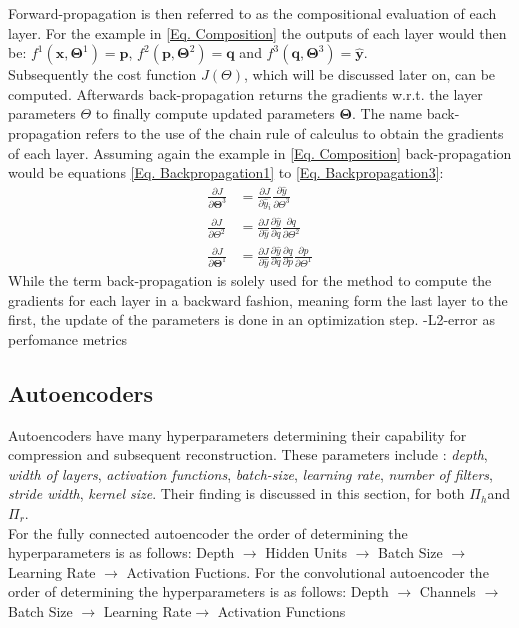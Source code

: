 \documentclass[12pt, a4paper]{article}
\newcommand{\hy}{\(\Pi_h\)}
\newcommand{\rare}{\(\Pi_r\)}
\begin{document}
\noindent
Forward-propagation is then referred to as the compositional evaluation of each layer. For the example in \cref{Eq. Composition} the outputs of each layer would then be:  \(f^1(\mathbf{x},\mathbf{\Theta}^1) = \mathbf{p}\), \(f^2(\mathbf{p},\mathbf{\Theta}^2) = \mathbf{q}\) and \(f^3(\mathbf{q},\mathbf{\Theta}^3) = \mathbf{\hat{y}}\).\\
Subsequently the cost function \(J(\Theta)\), which will be discussed later on, can be computed. Afterwards back-propagation returns the gradients w.r.t. the layer parameters \(\Theta\) to finally compute updated parameters \(\mathbf{\Theta}\).  The name back-propagation refers to the use of the chain rule of calculus to obtain the gradients of each layer. Assuming again the example in \cref{Eq. Composition} back-propagation would be equations \cref{Eq. Backpropagation1} to \cref{Eq. Backpropagation3}:
\begin{align}
	\frac{\partial J}{\partial \mathbf{\Theta}^3} &= \frac{\partial J}{\partial\hat{y}_i}\frac{\partial\hat{y}}{\partial \Theta^3}
\label{Eq. Backpropagation3}\\
	\frac{\partial J}{\partial \Theta^2} &= \frac{\partial J}{\partial\hat{y}}\frac{\partial\hat{y}}{\partial q}\frac{\partial q}{\partial \Theta^2}
\label{Eq. Backpropagation2}\\
	\frac{\partial J}{\partial \mathbf{\Theta}^1} &= \frac{\partial J}{\partial\hat{y}}\frac{\partial\hat{y}}{\partial q}\frac{\partial q}{\partial p}\frac{\partial p}{\partial \Theta^1}
\label{Eq. Backpropagation1}
\end{align}
While the term back-propagation is solely used for the method to compute the gradients for each layer in a backward fashion, meaning form the last layer to the first, the update of the parameters is done in an optimization step.
-L2-error as perfomance metrics
\subsection{Autoencoders}
Autoencoders have many hyperparameters determining their capability for compression and subsequent reconstruction. These parameters include : \textit{depth}, \textit{width of layers}, \textit{activation functions}, \textit{batch-size}, \textit{learning rate}, \textit{number of filters}, \textit{stride width}, \textit{kernel size}. Their finding is discussed in this section, for both \hy and \rare.\\
For the fully connected autoencoder the order of determining the hyperparameters is as follows:
Depth $\rightarrow$ Hidden Units $\rightarrow$ Batch Size $\rightarrow$ Learning Rate $\rightarrow$ Activation Fuctions.
For the convolutional autoencoder the order of determining the hyperparameters is as follows:
Depth $\rightarrow$ Channels $\rightarrow$ Batch Size $\rightarrow$ Learning Rate$\rightarrow$ Activation Functions
\end{document}

